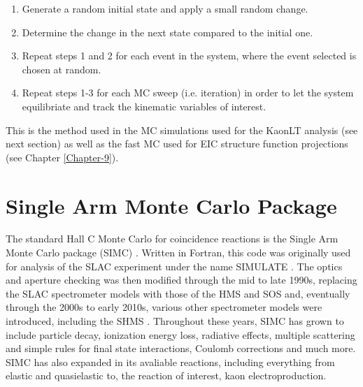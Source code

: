 \documentclass[
]{report}
\begin{document}
\begin{enumerate}
\item Generate a random initial state and apply a small random change.
\item Determine the change in the next state compared to the initial one.
\item Repeat steps 1 and 2 for each event in the system, where the event selected is chosen at random.
\item Repeat steps 1-3 for each MC sweep (i.e. iteration) in order to let the system equilibriate and track the kinematic variables of interest.
\end{enumerate}

\noindent This is the method used in the MC simulations used for the
KaonLT analysis (see next section) as well as the fast MC used for EIC
structure function projections (see Chapter \ref{Chapter-9}).

\hypertarget{Section-6.1}{%
\section{Single Arm Monte Carlo Package}\label{Section-6.1}}

The standard Hall C Monte Carlo for coincidence reactions is the Single
Arm Monte Carlo package (SIMC) \cite{gaskell_github_2023}. Written in
Fortran, this code was originally used for analysis of the SLAC
experiment under the name SIMULATE \cite{arrington_inclusive_1998}. The
optics and aperture checking was then modified through the mid to late
1990s, replacing the SLAC spectrometer models with those of the HMS and
SOS and, eventually through the 2000s to early 2010s, various other
spectrometer models were introduced, including the SHMS
\cite{12_gev_upgrade_pcdr_editorial_board_pre-conceptual_2004}
\cite{gaskell_simc_2009} \cite{arrington_-b-simc_2001}. Throughout these
years, SIMC has grown to include particle decay, ionization energy loss,
radiative effects, multiple scattering and simple rules for final state
interactions, Coulomb corrections and much more. SIMC has also expanded
in its avaliable reactions, including everything from elastic and
quasielastic to, the reaction of interest, kaon electroproduction.
\end{document}
